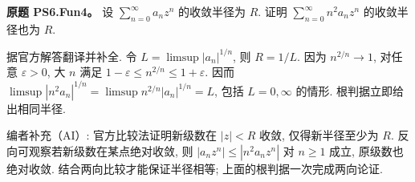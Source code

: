 \begin{exercise}
\textbf{原题 PS6.Fun4。}\label{ass:ps6-fun4}
设 $\sum_{n=0}^\infty a_nz^n$ 的收敛半径为 $R$. 证明 $\sum_{n=0}^\infty n^2a_nz^n$ 的收敛半径也为 $R$.
\end{exercise}
\begin{solution}
据官方解答翻译并补全. 令 $L=\limsup|a_n|^{1/n}$, 则 $R=1/L$. 因为 $n^{2/n}\to1$, 对任意 $\varepsilon>0$, 大 $n$ 满足 $1-\varepsilon\le n^{2/n}\le1+\varepsilon$. 因而
$\limsup|n^2a_n|^{1/n}=\limsup n^{2/n}|a_n|^{1/n}=L$, 包括 $L=0,\infty$ 的情形. 根判据立即给出相同半径.

编者补充（AI）: 官方比较法证明新级数在 $|z|<R$ 收敛, 仅得新半径至少为 $R$. 反向可观察若新级数在某点绝对收敛, 则 $|a_nz^n|\le|n^2a_nz^n|$ 对 $n\ge1$ 成立, 原级数也绝对收敛. 结合两向比较才能保证半径相等; 上面的根判据一次完成两向论证.
\end{solution}
